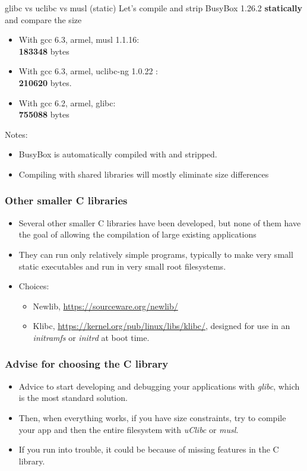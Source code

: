 \begin{frame}{glibc vs uclibc vs musl (static)}
  Let's compile and strip BusyBox 1.26.2 {\bf statically} and compare the size
  \begin{itemize}
    \item With gcc 6.3, armel, musl 1.1.16:\\
          {\bf 183348} bytes
    \item With gcc 6.3, armel, uclibc-ng 1.0.22 :\\
          {\bf 210620} bytes.\\
    \item With gcc 6.2, armel, glibc:\\
          {\bf 755088} bytes
  \end{itemize}
  Notes:
  \begin{itemize}
    \item BusyBox is automatically compiled with  and stripped.
    \item Compiling with shared libraries will mostly eliminate size differences
  \end{itemize}
\end{frame}

\begin{frame}
  \frametitle{Other smaller C libraries}
  \begin{itemize}
  \item Several other smaller C libraries have been developed, but
    none of them have the goal of allowing the compilation of large
    existing applications
  \item They can run only relatively simple programs,
	typically to make very small static executables and run
	in very small root filesystems.
  \item Choices:
    \begin{itemize}
    \item Newlib, \url{https://sourceware.org/newlib/}
    \item Klibc, \url{https://kernel.org/pub/linux/libs/klibc/},
      designed for use in an {\em initramfs} or {\em initrd} at boot
      time.
    \end{itemize}
  \end{itemize}
\end{frame}

\begin{frame}
  \frametitle{Advise for choosing the C library}
  \begin{itemize}
  \item Advice to start developing and debugging your applications with
        {\em glibc}, which is the most standard solution.
  \item Then, when everything works, if you have size constraints, try to compile
        your app and then the entire filesystem with {\em uClibc} or {\em musl}.
  \item If you run into trouble, it could be because of missing features
        in the C library.
  \end{itemize}
\end{frame}
